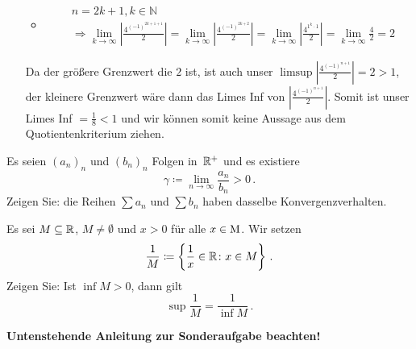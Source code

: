 \begin{lsg}
\begin{enumerate}[label=$\mathrm{(\roman*)}$, ref=$\mathrm{\roman*}$]
\begin{itemize}
\begin{align*}
\end{align*}
\item\begin{align*}
&n = 2k + 1, k \in \mathbb{N} \\
&\Rightarrow \lim_{k \to \infty}\left|\frac{4^{(-1)^{2k+1+1}}}{2}\right| = \lim_{k \to \infty}\left|\frac{4^{(-1)^{2k+2}}}{2}\right| = \lim_{k \to \infty}\left|\frac{4^{1^k\cdot 1}}{2}\right| = \lim_{k \to \infty}\frac{4}{2} = 2
\end{align*}
\end{itemize}
Da der größere Grenzwert die $2$ ist, ist auch unser $\limsup\left|\frac{4^{(-1)^{n+1}}}{2}\right| = 2 > 1$, der kleinere Grenzwert wäre dann das Limes Inf von $\left|\frac{4^{(-1)^{n+1}}}{2}\right|$. Somit ist unser Limes Inf $= \frac{1}{8} < 1$ und wir können somit keine Aussage aus dem Quotientenkriterium ziehen.

\end{enumerate}
\end{lsg}


\bigskip


\begin{aufg}[6 Punkte]
Es seien $(a_n)_n$ und $(b_n)_n$ Folgen in~$\mathbb{R}^+$ und es existiere 
\[
 \gamma\coloneqq \lim_{n\to\infty} \frac{a_n}{b_n} > 0\,.
\]
Zeigen Sie: die Reihen $\sum a_n$ und $\sum b_n$ haben dasselbe Konvergenzverhalten.
\end{aufg}


\bigskip

\begin{lsg}  
\end{lsg}


\bigskip

\begin{aufg}\label{aufg:sonder1}
Es sei $M\subseteq\mathbb{R}$, $M\not=\emptyset$ und $x>0$ f\"ur alle $x\in\operatorname{M}$. Wir setzen
\[
 \frac1M \coloneqq \left\{ \frac1x \in \mathbb{R} \colon x\in M \right\}\,.
\]
Zeigen Sie: Ist $\inf M >0$, dann gilt 
\[
 \sup \frac1M = \frac{1}{\inf M}\,.
\]
\end{aufg}

\bigskip

\begin{lsg}
\end{lsg}

\bigskip 

\begin{center}
 {\large\textbf{Untenstehende Anleitung zur Sonderaufgabe beachten!}}
\end{center}

